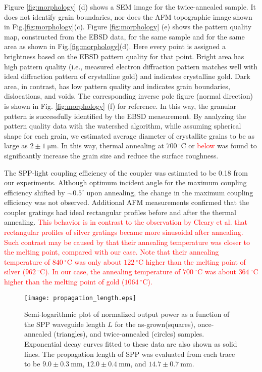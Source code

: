 \documentclass[aip,apl,reprint]{revtex4-1}
\begin{document}
Figure \ref{fig:morphology} (d) shows a SEM image for the twice-annealed sample. It does not identify grain boundaries, nor does the AFM topographic image shown in Fig.\ref{fig:morphology}(c).
Figure \ref{fig:morphology} (e) shows the pattern quality map, constructed from the EBSD data, for the same sample and for the same area as shown in Fig.\ref{fig:morphology}(d). Here every point is assigned a brightness based on the EBSD pattern quality for that point. Bright area has high pattern quality (i.e., measured electron diffraction pattern matches well with ideal diffraction pattern of crystalline gold) and indicates crystalline gold. Dark area, in contrast, has low pattern quality and indicates grain boundaries, dislocations, and voids. The corresponding inverse pole figure (normal direction) is shown in Fig. \ref{fig:morphology} (f) for reference. In this way, the granular pattern is successfully identified by the EBSD measurement. By analyzing the pattern quality data with the watershed algorithm\cite{Petr}, while assuming spherical shape for each grain, we estimated average diameter of crystallite grains to be as large as $2\pm1\:\mathrm{\mu m}$. In this way, thermal annealing at $700\:^\circ\mathrm{C}$ or \textcolor{red}{below} was found to significantly increase the grain size and reduce the surface roughness.

The SPP-light coupling efficiency of the coupler was estimated to be 0.18 from our experiments. Although optimum incident angle for the maximum coupling efficiency shifted by $\sim0.5^\circ$ upon annealing, the change in the maximum coupling efficiency was not observed. Additional AFM measurements confirmed that the coupler gratings had ideal rectangular profiles before and after the thermal annealing. 
\textcolor{red}{This behavior is in contrast to the observation by Cleary et al.\cite{Cleary2010} that rectangular profiles of silver gratings became more sinusoidal after annealing. Such contrast may be caused by that their annealing temperature was closer to the melting point, compared with our case. Note that their annealing temperature of $840\:^\circ\mathrm{C}$ was only about $122\:^\circ\mathrm{C}$ higher than the melting point of silver ($962\:^\circ\mathrm{C}$). In our case, the annealing temperature of $700\:^\circ\mathrm{C}$ was about $364\:^\circ\mathrm{C}$ higher than the melting point of gold ($1064\:^\circ\mathrm{C}$).}
 \begin{figure}
    \texttt{[image: propagation\_length.eps]}
    \caption{Semi-logarithmic plot of normalized output power as a function of the SPP waveguide length $L$ for the as-grown(squares), once-annealed (triangles), and twice-annealed (circles) samples. Exponential decay curves fitted to these data are also shown as solid lines. The propagation length of SPP was evaluated from each trace to be $9.0\pm0.3\:\mathrm{mm}$, $12.0\pm0.4\:\mathrm{mm}$, and $14.7\pm0.7\:\mathrm{mm}$.}
       \label{fig:propagation_length}
\end{figure}
\end{document}
